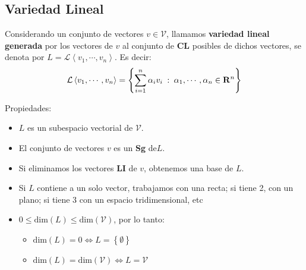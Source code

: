 \subsection{Variedad Lineal}
Considerando un conjunto de vectores \(v \in \mathcal{V}\), llamamos \textbf{variedad lineal generada} por los vectores de \(v\) al conjunto de \textbf{CL} posibles de dichos vectores, se denota por \(L=\mathcal{L}\left\langle v_1, \cdots, v_n\right\rangle \). Es decir:
\[
        \mathcal{L}\left\langle v_1, \cdots, v_n\right\rangle = \left\{\sum_{i=1}^n\alpha_i v_i \hspace{.25em} : \hspace{.25em} \alpha_1,\cdots,\alpha_n \in \mathbf{R}^n\right\}
\]
\par Propiedades:
\begin{itemize}
        \item \(L\) es un subespacio vectorial de \(\mathcal{V}\).
        \item El conjunto de vectores \(v\) es un \textbf{Sg} de\(L\).
        \item Si eliminamos los vectores \textbf{LI} de \(v\), obtenemos una base de \(L\).
        \item Si \(L\) contiene a un solo vector, trabajamos con una recta; si tiene 2, con un plano; si tiene 3 con un espacio tridimensional, etc
        \item \(0 \leq \text{dim}\left(L\right) \leq \text{dim}\left(\mathcal{V}\right) \), por lo tanto:
              \begin{itemize}
                      \item \(\text{dim}\left(L\right) = 0 \Leftrightarrow L = \left\{\emptyset\right\} \)
                      \item \(\text{dim}\left(L\right) = \text{dim}\left(\mathcal{V}\right) \Leftrightarrow L = \mathcal{V} \)
              \end{itemize}
\end{itemize}
